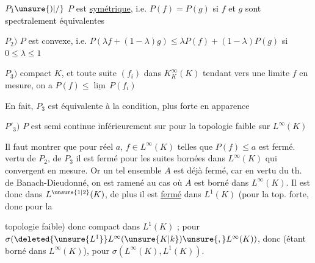 $P_1\unsure{)|/}$ $P$ est \uline{symétrique}, i.e. $P(f)=P(g)$ si $f$ et $g$ sont spectralement équivalentes

$P_2)$ $P$ est convexe, i.e. $P(\lambda f+(1-\lambda)g)\leq\lambda P(f)+(1-\lambda)P(g)$ si $0\leq\lambda\leq1$

$P_3)$   compact $K$,  et toute suite $(f_i)$ dans $K^\infty_K(K)$ tendant vers une  limite $f$ en mesure, on a $P(f)\leq\underline{\lim}\,P(f_i)$

En fait, $P_3$ est équivalente à la condition, plus forte en apparence

$P'_3)$  $P$ est semi continue inférieurement sur  pour la topologie faible sur $L^\infty(K)$

Il faut montrer que pour  réel $a$, \deleted{$P^{-1}([\unsure{a|-\infty},\unsure{-\infty|a}[)$}   $f\in L^\infty(K)$ telles que $P(f)\leq a$ est  fermé.      vertu de $P_2$,   de $P_3$ il est fermé pour les suites bornées dans $L^\infty(K)$ qui convergent en mesure. Or un tel ensemble $A$ est déjà  fermé, car en vertu du th. de Banach-Dieudonné, on est ramené au cas où $A$ est borné dans $L^\infty(K)$. Il est donc    dans $L^{\unsure{1|2}}(K)$,  de plus il est \uline{fermé} dans $L^1(K)$ (pour la top. forte, donc pour la

topologie faible) donc   compact dans $L^1(K)$ ;    pour $\sigma(\deleted{\unsure{L^1}}L^\infty(\unsure{K|k})\unsure{,}L^\infty(K))$, donc (étant borné dans $L^\infty(K)$), pour $\sigma(L^\infty(K),L^1(K))$.

